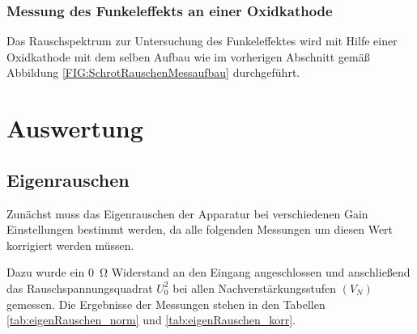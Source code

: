 \subsubsection{Messung des Funkeleffekts an einer Oxidkathode}
Das Rauschspektrum zur Untersuchung des Funkeleffektes wird mit Hilfe einer Oxidkathode mit dem selben Aufbau wie im vorherigen Abschnitt gemäß Abbildung \ref{FIG:SchrotRauschenMessaufbau} durchgeführt.


\section{Auswertung}
\subsection{Eigenrauschen}
Zunächst muss das Eigenrauschen der Apparatur bei verschiedenen Gain Einstellungen bestimmt werden, da alle folgenden Messungen um diesen Wert korrigiert werden müssen.

Dazu wurde ein \SI{0}{\ohm} Widerstand an den Eingang angeschlossen und anschließend das Rauschspannungsquadrat $U_0^2$ bei allen Nachverstärkungsstufen $(V_N)$ gemessen. Die Ergebnisse der Messungen stehen in den Tabellen \ref{tab:eigenRauschen_norm} und \ref{tab:eigenRauschen_korr}.

